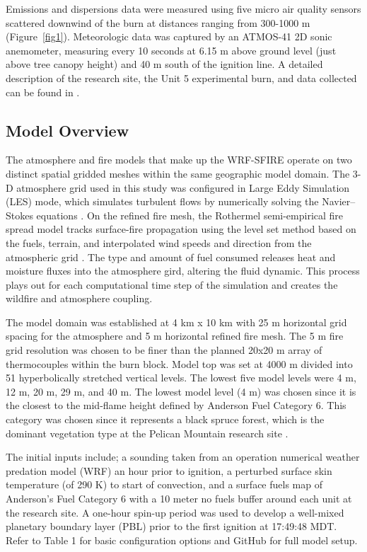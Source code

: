 \documentclass[preprints,article,accept,moreauthors,pdftex]{Definitions/mdpi}
\begin{document}
Emissions and dispersions data were measured using five micro air quality sensors scattered downwind of the burn at distances ranging from 300-1000 m (Figure~\ref{fig1}). Meteorologic data was captured by an ATMOS-41 2D sonic anemometer, measuring every 10 seconds at 6.15 m above ground level (just above tree canopy height) and 40 m south of the ignition line. A detailed description of the research site, the Unit 5 experimental burn, and data collected can be found in \cite{thompson_recent_2020,thompson_data_2020,huda_study_2020}.

\subsection{Model Overview}

The atmosphere and fire models that make up the WRF-SFIRE operate on two distinct spatial gridded meshes within the same geographic model domain. The 3-D atmosphere grid used in this study was configured in Large Eddy Simulation (LES) mode, which simulates turbulent flows by numerically solving the Navier–Stokes equations \cite{mandel_coupled_2011,mandel_recent_2014}. On the refined fire mesh, the Rothermel semi-empirical fire spread model tracks surface-fire propagation using the level set method based on the fuels, terrain, and interpolated wind speeds and direction from the atmospheric grid \cite{mandel_coupled_2011,mandel_recent_2014,munozesparza_accurate_2018}. The type and amount of fuel consumed releases heat and moisture fluxes into the atmosphere gird, altering the fluid dynamic. This process plays out for each computational time step of the simulation and creates the wildfire and atmosphere coupling.

The model domain was established at 4 km x 10 km with 25 m horizontal grid spacing for the atmosphere and 5 m horizontal refined fire mesh. The 5 m fire grid resolution was chosen to be finer than the planned 20x20 m array of thermocouples within the burn block. Model top was set at 4000 m divided into 51 hyperbolically stretched vertical levels. The lowest five model levels were 4 m, 12 m, 20 m, 29 m, and 40 m. The lowest model level (4 m) was chosen since it is the closest to the mid-flame height defined by Anderson Fuel Category 6. This category was chosen since it represents a black spruce forest, which is the dominant vegetation type at the Pelican Mountain research site \cite{anderson_aids_1982}.

The initial inputs include; a sounding taken from an operation numerical weather predation model (WRF) an hour prior to ignition, a perturbed surface skin temperature (of 290 K) to start of convection, and a surface fuels map of Anderson’s Fuel Category 6 with a 10 meter no fuels buffer around each unit at the research site. A one-hour spin-up period was used to develop a well-mixed planetary boundary layer (PBL) prior to the first ignition at 17:49:48 MDT. Refer to Table 1 for basic configuration options and GitHub for full model setup.
\end{document}
